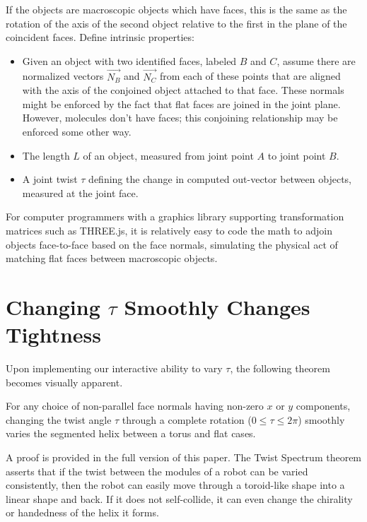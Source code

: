 \documentclass{svproc}
\begin{document}
If the objects are macroscopic objects which have faces, this is the same as the rotation
of the axis of the second object relative to the first in the plane of the coincident faces.
Define intrinsic properties:

\begin{itemize}
\item Given an object with two identified faces, labeled $B$ and $C$, assume there are normalized
  vectors $\overrightarrow{N_B}$ and $\overrightarrow{N_C}$
  from each of these points that are aligned with the axis of the conjoined object attached to
  that face. These normals might be enforced by the fact that flat faces are joined in the joint plane.
  However, molecules don't have faces; this conjoining relationship may be enforced some other way.
\item The length $L$ of an object, measured from joint point $A$ to joint point $B$.
\item A joint twist $\tau$ defining the change in computed out-vector between objects,
  measured at the joint face.
\end{itemize}


For computer programmers with a graphics library supporting transformation matrices such
as THREE.js\cite{dirksen2013learning},
it is relatively easy to code the math to adjoin objects
face-to-face based on the face normals, simulating the physical act of
matching flat faces between macroscopic objects.


\section{Changing $\tau$ Smoothly Changes Tightness}

Upon implementing our interactive ability to vary $\tau$, the following
theorem becomes visually apparent.

\begin{theorem}
  For any choice of non-parallel face normals having non-zero $x$ or $y$ components,
  changing the twist angle $\tau$ through a complete rotation ($0 \leq \tau \leq 2\pi$)
  smoothly varies the segmented helix
  between a torus and flat cases.
\end{theorem}

A proof is provided in the full version of this paper\cite{readfullsegmentedhelix}.
The Twist Spectrum theorem asserts that if the twist between the modules of a robot
can be varied consistently, then the robot can easily move through a toroid-like shape
into a linear shape and back. If it does not self-collide, it can even change the chirality
or handedness of the helix it forms.
\end{document}

